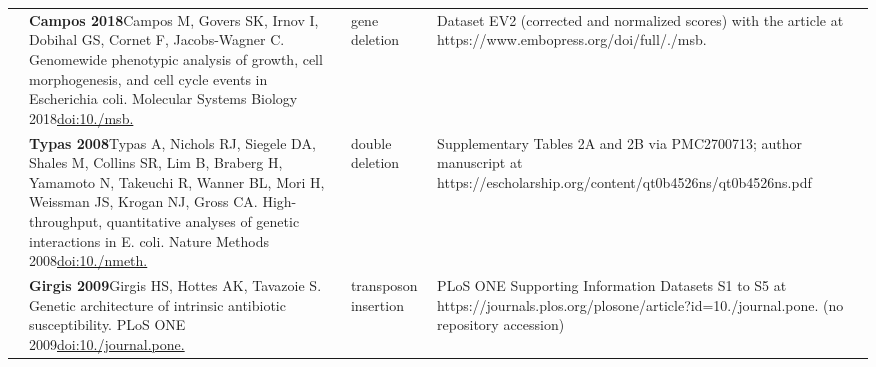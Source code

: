 \begin{landscape}
\begin{longtable}{@{}r@{\hspace{4pt}} L{86mm} L{74mm} L{78mm}@{}}
 & \textbf{Campos 2018}\newline Campos M, Govers SK, Irnov I, Dobihal GS, Cornet F, Jacobs-Wagner C. Genomewide phenotypic analysis of growth, cell morphogenesis, and cell cycle events in Escherichia coli. Molecular Systems Biology 2018\newline \href{https://doi.org/10.15252/msb.20177573}{doi:10./\allowbreak msb.} & gene deletion & Dataset EV2 (corrected and normalized scores) with the article at https:/\allowbreak /\allowbreak www.\allowbreak embopress.\allowbreak org/\allowbreak doi/\allowbreak full/./\allowbreak msb. \\
 & \textbf{Typas 2008}\newline Typas A, Nichols RJ, Siegele DA, Shales M, Collins SR, Lim B, Braberg H, Yamamoto N, Takeuchi R, Wanner BL, Mori H, Weissman JS, Krogan NJ, Gross CA. High-throughput, quantitative analyses of genetic interactions in E. coli. Nature Methods 2008\newline \href{https://doi.org/10.1038/nmeth.1240}{doi:10./\allowbreak nmeth.} & double deletion & Supplementary Tables 2A and 2B via PMC2700713; author manuscript at https:/\allowbreak /\allowbreak escholarship.\allowbreak org/\allowbreak content/\allowbreak qt0b4526ns/\allowbreak qt0b4526ns.\allowbreak pdf \\
 & \textbf{Girgis 2009}\newline Girgis HS, Hottes AK, Tavazoie S. Genetic architecture of intrinsic antibiotic susceptibility. PLoS ONE 2009\newline \href{https://doi.org/10.1371/journal.pone.0005629}{doi:10./\allowbreak journal.\allowbreak pone.} & transposon insertion & PLoS ONE Supporting Information Datasets S1 to S5 at https:/\allowbreak /\allowbreak journals.\allowbreak plos.\allowbreak org/\allowbreak plosone/\allowbreak article?id=10./\allowbreak journal.\allowbreak pone. (no repository accession) \\

\end{longtable}
\end{landscape}
